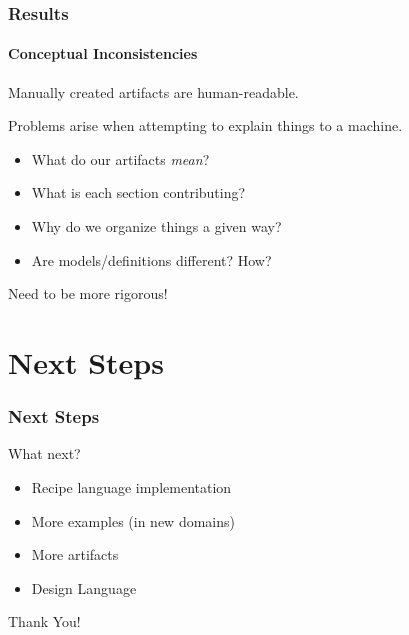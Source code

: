 \documentclass{beamer}
\begin{document}

\begin{frame}[fragile]

\frametitle{Results} %
\framesubtitle{Conceptual Inconsistencies}

Manually created artifacts are human-readable.

Problems arise when attempting to explain things to a machine.

\begin{itemize}
\item What do our artifacts \emph{mean}?
\item What is each section contributing? %
\item Why do we organize things a given way?
\item Are models/definitions different? How?
\end{itemize}

Need to be more rigorous!

\end{frame}


\section[Next Steps]{Next Steps}


\begin{frame}

\frametitle{Next Steps}


\begin{Large}
What next?
\end{Large}

\begin{itemize}
\item Recipe language implementation %
\item More examples (in new domains) %
\item More artifacts  %
\item Design Language %
\end{itemize}
\end{frame}


\begin{frame}
\begin{center}
\Huge Thank You!
\end{center}
\end{frame}

\end{document}

